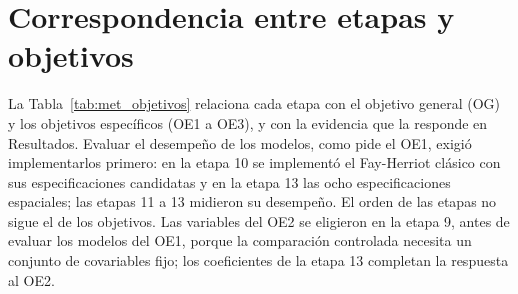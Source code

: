 \section{Correspondencia entre etapas y objetivos}
\label{sec:met_objetivos}

La Tabla~\ref{tab:met_objetivos} relaciona cada etapa con el objetivo general (OG) y los objetivos específicos (OE1 a OE3), y con la evidencia que la responde en Resultados. Evaluar el desempeño de los modelos, como pide el OE1, exigió implementarlos primero: en la etapa 10 se implementó el Fay-Herriot clásico con sus especificaciones candidatas y en la etapa 13 las ocho especificaciones espaciales; las etapas 11 a 13 midieron su desempeño. El orden de las etapas no sigue el de los objetivos. Las variables del OE2 se eligieron en la etapa 9, antes de evaluar los modelos del OE1, porque la comparación controlada necesita un conjunto de covariables fijo; los coeficientes de la etapa 13 completan la respuesta al OE2.

